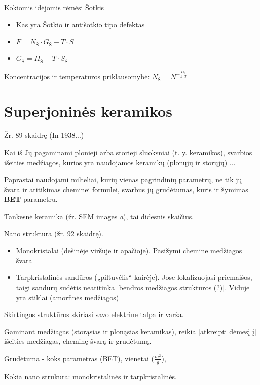 \begin{remember}
  \item Kokiomis idėjomis rėmėsi Šotkis\begin{itemize}
    \item Kas yra Šotkio ir antišotkio tipo defektas
    \item $F = N_Š \cdot G_Š - T \cdot S$
    \item $G_Š = H_Š - T \cdot S_Š$
  \end{itemize}
  \item Koncentracijos ir temperatūros priklausomybė:
  $N_Š = N^{-\frac{G_Š}{k \cdot T}}$
\end{remember}


\section{Superjoninės keramikos}
Žr. 89 skaidrę (In 1938...)

Kai iš Jų pagaminami plonieji arba storieji sluoksniai (t. y. keramikos),
svarbios išeities medžiagos, kurios yra naudojamos keramikų (plonųjų ir
storųjų) ...

Paprastai naudojami milteliai, kurių vienas pagrindinių parametrų,
ne tik jų švara ir atitikimas cheminei formulei,
svarbus jų grudėtumas, kuris ir žymimas \textbf{BET} parametru.

Tankesnė keramika (žr. SEM images \textit{a}), tai didesnis skaičius.

Nano struktūra (žr. 92 skaidrę).
\begin{itemize}
  \item Monokristalai (dešinėje viršuje ir apačioje). Pasižymi chemine
    medžiagos švara
  \item Tarpkristalinės sandūros („piltuvėlis“ kairėje).
    Jose lokalizuojasi priemaišos, taigi sandūrų sudėtis neatitinka
    [bendros medžiagos struktūros (?)]. Viduje yra stiklai (amorfinės
    medžiagos)
\end{itemize}
Skirtingos struktūros skiriasi savo elektrine talpa ir varža.

\begin{remember}
  \item Gaminant medžiagas (storąsias ir plonąsias keramikas), reikia
    [atkreipti dėmesį į] išeities medžiagas, cheminę švarą ir grudėtumą.
  \item Grudėtuma - koks parametras (BET), vienetai ($\frac{m^2}{g}$),
  \item Kokia nano strukūra: monokristalinės ir tarpkristalinės.
\end{remember}

